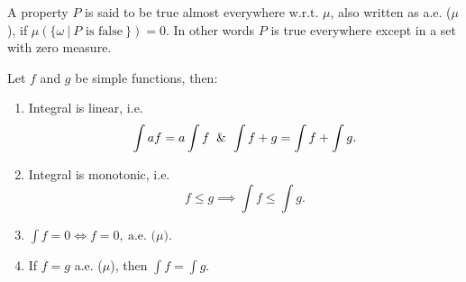 \begin{definition}
  A property $P$ is said to be true almost everywhere w.r.t. $\mu$, also written as a.e. ($\mu$), if $\mu(\{\omega\ |\ \text{$P$ is false}\ \}) = 0$. In other words $P$ is true everywhere except in a set with zero measure.
\end{definition}
\begin{proposition}\label{pro:properties}
  Let $f$ and $g$ be simple functions, then:
  \begin{enumerate}
    \item Integral is linear, i.e.
      \[\int af = a\int f \And \int f+g = \int f + \int g.\]
    \item Integral is monotonic, i.e.
      \[f\leq g \implies \int f \leq \int g.\]
    \item $\int f = 0 \iff f = 0,\ \text{a.e. ($\mu$)} $.
    \item If $f=g$ a.e. ($\mu$), then $\int f = \int g$.
  \end{enumerate}
\end{proposition}

